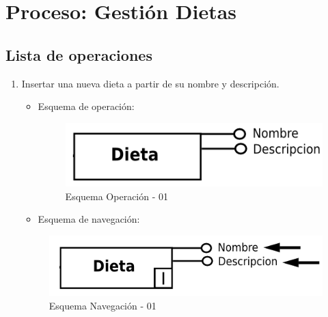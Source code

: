 \documentclass[a4paper,12pt]{report}
\begin{document}
\section{Proceso: Gestión Dietas}
\label{sec-7-5}
\subsection{Lista de operaciones}
\label{sec-7-5-1}
\begin{enumerate}
\item Insertar una nueva dieta a partir de su nombre y
descripción.
\begin{itemize}
\item Esquema de operación:
\begin{figure}[!htp]
\centering
\includegraphics[width=0.5\linewidth]{./operaciones/img/Dietas/01_ope.png}
\caption{Esquema Operación - 01}
\label{fig:ope01}
\medskip
\footnotesize
{}
\end{figure}
\item Esquema de navegación:
\end{itemize}
\begin{figure}[!htp]
\centering
\includegraphics[width=0.5\linewidth]{./operaciones/img/Dietas/01_nav.png}
\caption{Esquema Navegación - 01}
\label{fig:nave01}
\medskip
\footnotesize
{}
\end{figure}


\end{enumerate}
\end{document}
